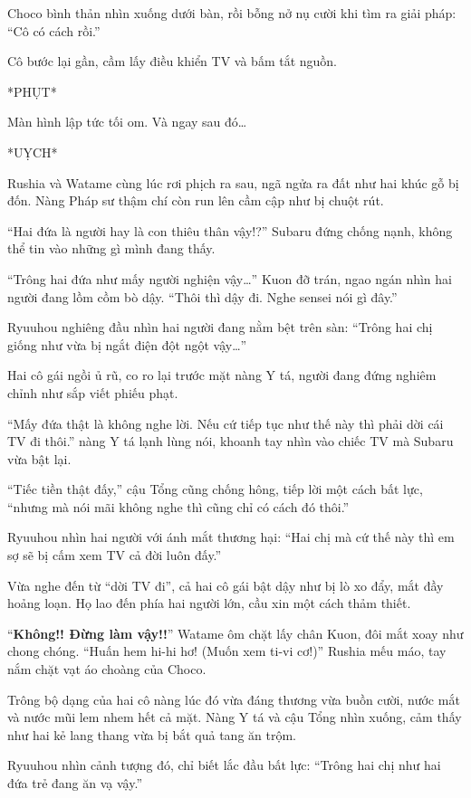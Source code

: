 \documentclass[../main.tex]{subfiles}
\begin{document}
Choco bình thản nhìn xuống dưới bàn, rồi bỗng nở nụ cười khi tìm ra giải pháp: ``Cô có cách rồi.''

Cô bước lại gần, cầm lấy điều khiển TV và bấm tắt nguồn.

*PHỤT*

Màn hình lập tức tối om. Và ngay sau đó\dots

*UỴCH*

Rushia và Watame cùng lúc rơi phịch ra sau, ngã ngửa ra đất như hai khúc gỗ bị đốn. Nàng Pháp sư thậm chí còn run lên cầm cập như bị chuột rút.

``Hai đứa là người hay là con thiêu thân vậy!?'' Subaru đứng chống nạnh, không thể tin vào những gì mình đang thấy.

``Trông hai đứa như mấy người nghiện vậy\dots'' Kuon đỡ trán, ngao ngán nhìn hai người đang lồm cồm bò dậy. ``Thôi thì dậy đi. Nghe sensei nói gì đây.''

Ryuuhou nghiêng đầu nhìn hai người đang nằm bệt trên sàn: ``Trông hai chị giống như vừa bị ngắt điện đột ngột vậy\dots''

Hai cô gái ngồi ủ rũ, co ro lại trước mặt nàng Y tá, người đang đứng nghiêm chỉnh như sắp viết phiếu phạt.

``Mấy đứa thật là không nghe lời. Nếu cứ tiếp tục như thế này thì phải dời cái TV đi thôi.'' nàng Y tá lạnh lùng nói, khoanh tay nhìn vào chiếc TV mà Subaru vừa bật lại.

``Tiếc tiền thật đấy,'' cậu Tổng cũng chống hông, tiếp lời một cách bất lực, ``nhưng mà nói mãi không nghe thì cũng chỉ có cách đó thôi.''

Ryuuhou nhìn hai người với ánh mắt thương hại: ``Hai chị mà cứ thế này thì em sợ sẽ bị cấm xem TV cả đời luôn đấy.''

Vừa nghe đến từ ``dời TV đi'', cả hai cô gái bật dậy như bị lò xo đẩy, mắt đầy hoảng loạn. Họ lao đến phía hai người lớn, cầu xin một cách thảm thiết.


``\textbf{Không!! Đừng làm vậy!!}'' Watame ôm chặt lấy chân Kuon, đôi mắt xoay như chong chóng. ``Huấn hem hi-hi hơ! (Muốn xem ti-vi cơ!)'' Rushia mếu máo, tay nắm chặt vạt áo choàng của Choco.

Trông bộ dạng của hai cô nàng lúc đó vừa đáng thương vừa buồn cười, nước mắt và nước mũi lem nhem hết cả mặt. Nàng Y tá và cậu Tổng nhìn xuống, cảm thấy như hai kẻ lang thang vừa bị bắt quả tang ăn trộm.

Ryuuhou nhìn cảnh tượng đó, chỉ biết lắc đầu bất lực: ``Trông hai chị như hai đứa trẻ đang ăn vạ vậy.''
\end{document}
